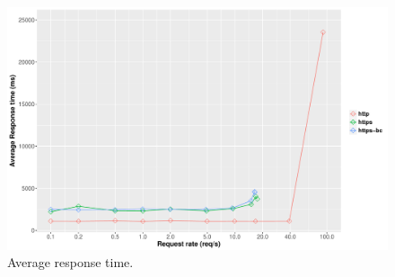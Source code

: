 \begin{figure}
  \centering
  \includegraphics[scale=0.4]{Figures/evaluation/average-response-time.pdf}
  \caption{Average response time.}
  \label{fig:average-response-time}
\end{figure}

